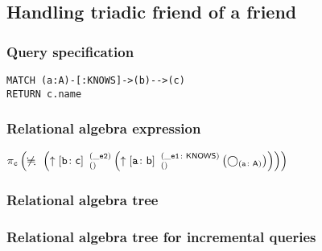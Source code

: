 \subsection{Handling triadic friend of a friend}

\subsubsection*{Query specification}

\begin{lstlisting}
MATCH (a:A)-[:KNOWS]->(b)-->(c)
RETURN c.name
\end{lstlisting}

\subsubsection*{Relational algebra expression}

$\projection{\var{c}} \left(\alldifferent{} \left(\expandout{b}{c}{}{\_e2}{} \left(\expandout{a}{b}{}{\_e1}{KNOWS} \left(\getvertices{a}{A}\right)\right)\right)\right)$

\subsubsection*{Relational algebra tree}


\subsubsection*{Relational algebra tree for incremental queries}


